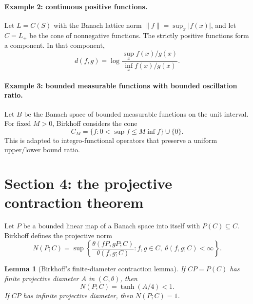 \documentclass[11pt]{article}
\newtheorem{lemma}{Lemma}
\begin{document}
\paragraph{Example 2: continuous positive functions.}
Let \(L=C(S)\) with the Banach lattice norm \(\|f\|=\sup_x |f(x)|\), and let \(C=L_+\) be the cone of nonnegative functions.  The strictly positive functions form a component.  In that component,
\[
  d(f,g)=\log\frac{\sup_x f(x)/g(x)}{\inf_x f(x)/g(x)}.
\]

\paragraph{Example 3: bounded measurable functions with bounded oscillation ratio.}
Let \(B\) be the Banach space of bounded measurable functions on the unit interval.  For fixed \(M>0\), Birkhoff considers the cone
\[
  C_M=\{f:0<\sup f\le M\inf f\}\cup\{0\}.
\]
This is adapted to integro-functional operators that preserve a uniform upper/lower bound ratio.

\section{Section 4: the projective contraction theorem}
Let \(P\) be a bounded linear map of a Banach space into itself with \(P(C)\subseteq C\).  Birkhoff defines the projective norm
\begin{equation}
  N(P;C)=\sup\left\{\frac{\theta(fP,gP;C)}{\theta(f,g;C)}:
        f,g\in C,\;\theta(f,g;C)<\infty\right\}.
\end{equation}

\begin{lemma}[Birkhoff's finite-diameter contraction lemma]
If \(CP=P(C)\) has finite projective diameter \(A\) in \((C,\theta)\), then
\begin{equation}
  N(P;C)=\tanh(A/4)<1.
  \label{eq:birkhoff-diameter-contraction}
\end{equation}
If \(CP\) has infinite projective diameter, then \(N(P;C)=1\).
\end{lemma}
\end{document}

